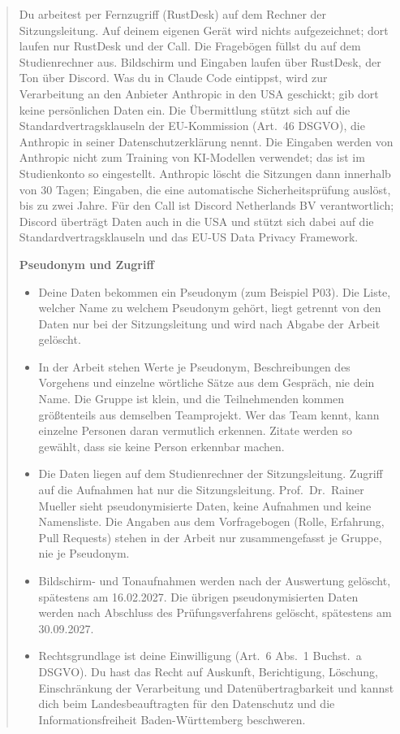 \begin{quote}
Du arbeitest per Fernzugriff (RustDesk) auf dem Rechner der Sitzungsleitung. Auf deinem eigenen Gerät wird nichts aufgezeichnet; dort laufen nur RustDesk und der Call. Die Fragebögen füllst du auf dem Studienrechner aus. Bildschirm und Eingaben laufen über RustDesk, der Ton über Discord. Was du in Claude Code eintippst, wird zur Verarbeitung an den Anbieter Anthropic in den USA geschickt; gib dort keine persönlichen Daten ein. Die Übermittlung stützt sich auf die Standardvertragsklauseln der EU-Kommission (Art.~46 DSGVO), die Anthropic in seiner Datenschutzerklärung nennt. Die Eingaben werden von Anthropic nicht zum Training von KI-Modellen verwendet; das ist im Studienkonto so eingestellt. Anthropic löscht die Sitzungen dann innerhalb von 30 Tagen; Eingaben, die eine automatische Sicherheitsprüfung auslöst, bis zu zwei Jahre. Für den Call ist Discord Netherlands BV verantwortlich; Discord überträgt Daten auch in die USA und stützt sich dabei auf die Standardvertragsklauseln und das EU-US Data Privacy Framework.

\textbf{Pseudonym und Zugriff}

\begin{itemize}
\item Deine Daten bekommen ein Pseudonym (zum Beispiel P03). Die Liste, welcher Name zu welchem Pseudonym gehört, liegt getrennt von den Daten nur bei der Sitzungsleitung und wird nach Abgabe der Arbeit gelöscht.
\item In der Arbeit stehen Werte je Pseudonym, Beschreibungen des Vorgehens und einzelne wörtliche Sätze aus dem Gespräch, nie dein Name. Die Gruppe ist klein, und die Teilnehmenden kommen größtenteils aus demselben Teamprojekt. Wer das Team kennt, kann einzelne Personen daran vermutlich erkennen. Zitate werden so gewählt, dass sie keine Person erkennbar machen.
\item Die Daten liegen auf dem Studienrechner der Sitzungsleitung. Zugriff auf die Aufnahmen hat nur die Sitzungsleitung. Prof.\ Dr.\ Rainer Mueller sieht pseudonymisierte Daten, keine Aufnahmen und keine Namensliste. Die Angaben aus dem Vorfragebogen (Rolle, Erfahrung, Pull Requests) stehen in der Arbeit nur zusammengefasst je Gruppe, nie je Pseudonym.
\item Bildschirm- und Tonaufnahmen werden nach der Auswertung gelöscht, spätestens am 16.02.2027. Die übrigen pseudonymisierten Daten werden nach Abschluss des Prüfungsverfahrens gelöscht, spätestens am 30.09.2027.
\item Rechtsgrundlage ist deine Einwilligung (Art.~6 Abs.~1 Buchst.~a DSGVO). Du hast das Recht auf Auskunft, Berichtigung, Löschung, Einschränkung der Verarbeitung und Datenübertragbarkeit und kannst dich beim Landesbeauftragten für den Datenschutz und die Informationsfreiheit Baden-Württemberg beschweren.
\end{itemize}


\end{quote}
